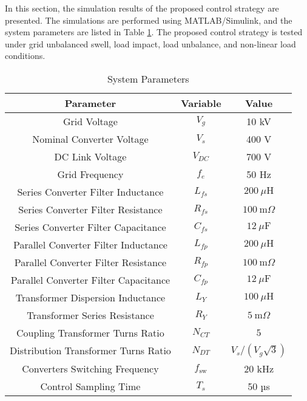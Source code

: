 
In this section, the simulation results of the proposed control strategy are presented. The simulations are performed using MATLAB/Simulink, and the system parameters are listed in Table \ref{tab:params}. The proposed control strategy is tested under grid unbalanced swell, load impact, load unbalance, and non-linear load conditions.

\begin{table}[h!]
    \centering
    \caption{System Parameters}
    \begin{tabular}{|c|c|c|}
        \hline
        Parameter & Variable & Value \\
        \hline
        \hline
        Grid Voltage & $V_{g}$ & 10 kV \\
        Nominal Converter Voltage & $V_s$ & 400 V \\
        DC Link Voltage & $V_{DC}$ & 700 V \\
        Grid Frequency & $f_e$ & 50 Hz \\
        Series Converter Filter Inductance & $L_{fs}$ & $200\ \mu\text{H}$ \\
        Series Converter Filter Resistance & $R_{fs}$ & $100\ \text{m}\Omega$ \\
        Series Converter Filter Capacitance & $C_{fs}$ & $12\ \mu\text{F}$ \\
        Parallel Converter Filter Inductance & $L_{fp}$ & $200\ \mu\text{H}$ \\
        Parallel Converter Filter Resistance & $R_{fp}$ & $100\ \text{m}\Omega$ \\
        Parallel Converter Filter Capacitance & $C_{fp}$ & $12\ \mu\text{F}$ \\
        Transformer Dispersion Inductance & $L_Y$ & $100\ \mu\text{H}$ \\
        Transformer Series Resistance & $R_Y$ & $5\ \text{m}\Omega$\\
        Coupling Transformer Turns Ratio & $N_{CT}$ & $5$ \\
        Distribution Transformer Turns Ratio & $N_{DT}$ & $V_s/(V_g\sqrt{3})$ \\
        Converters Switching Frequency & $f_{\text{sw}}$ & 20 kHz \\
        Control Sampling Time & $T_s$ & 50 µs \\
        \hline
    \end{tabular}
    \label{tab:params}
\end{table}


